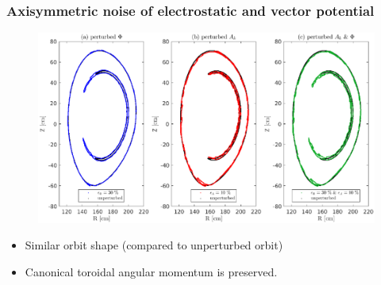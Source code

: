 \documentclass{beamer}
\newcommand{\be}[1]{\begin{equation} \label{#1}}
\newcommand{\ee}{\end{equation}}
\begin{document}
\begin{frame}
\frametitle{Axisymmetric noise of electrostatic and vector potential}
\vspace{-0.4cm}
\begin{figure}
	\hspace*{-1.05cm}\includegraphics[width=1.0\textwidth]{FIGURES/axissymetric_noise.eps}
\end{figure}
\begin{itemize}
	\vspace*{-0.6cm}
	\item Similar orbit shape (compared to unperturbed orbit)
	\item Canonical toroidal angular momentum is preserved.
\end{itemize}
\end{frame}


\end{document}
